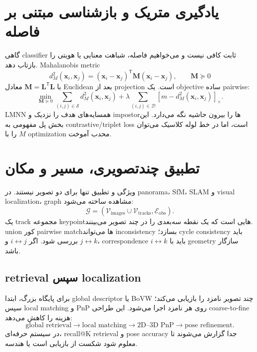 \documentclass[12pt,openany,oneside]{book}
\newcommand{\trans}{^{\mathsf T}}
\newcommand{\vect}[1]{\bm{#1}}
\newcommand{\mat}[1]{\bm{#1}}
\begin{document}
\section{یادگیری متریک و بازشناسی مبتنی بر فاصله}
گاهی classifier ثابت کافی نیست و می‌خواهیم فاصله، شباهت معنایی یا هویتی را بازتاب دهد. Mahalanobis metric
\begin{equation}
d_M^2(\vect x_i,\vect x_j)=(\vect x_i-\vect x_j)\trans\mat M(\vect x_i-\vect x_j),\qquad \mat M\succeq0
\end{equation}
با $\mat M=\mat L\trans\mat L$ معادل Euclidean بعد از projection است. یک objective ساده pairwise:
\begin{equation}
\min_{\mat M\succeq0}
\sum_{(i,j)\in\mathcal S}d_M^2(\vect x_i,\vect x_j)
+\lambda\sum_{(i,j)\in\mathcal D}[m-d_M^2(\vect x_i,\vect x_j)]_+.
\end{equation}
LMNN همسایه‌های هدف را نزدیک و impostorها را بیرون حاشیه نگه می‌دارد. این بخش پل مفهومی به contrastive/triplet loss است، اما در خط لوله کلاسیک می‌توان $M$ را با optimization محدب آموخت.

\section{تطبیق چندتصویری، مسیر و مکان}
ویژگی و تطبیق تنها برای دو تصویر نیستند. در panorama، SfM، SLAM و visual localization، graph مشاهده ساخته می‌شود:
\begin{equation}
\mathcal G=(\mathcal V_{\mathrm{images}}\cup\mathcal V_{\mathrm{tracks}},\mathcal E_{\mathrm{obs}}).
\end{equation}
یک track مجموعه keypointهایی است که یک نقطه سه‌بعدی را در چند تصویر می‌بینند. union کور pairwise matchها می‌تواند inconsistency بسازد؛ cycle consistency باید بررسی شود. اگر $i\leftrightarrow j$ و $j\leftrightarrow k$، correspondence $i\leftrightarrow k$ باید با geometry سازگار باشد.

\subsection{retrieval سپس localization}
برای پایگاه بزرگ، ابتدا global descriptor یا BoVW چند تصویر نامزد را بازیابی می‌کند؛ سپس local matching و PnP روی هر نامزد اجرا می‌شود. این طراحی coarse-to-fine هزینه را کاهش می‌دهد:
\[
\text{global retrieval}\rightarrow\text{local matching}\rightarrow\text{2D--3D PnP}\rightarrow\text{pose refinement}.
\]
در سیستم حرفه‌ای، recall@K retrieval و pose accuracy جدا گزارش می‌شوند تا معلوم شود شکست از بازیابی است یا هندسه.
\end{document}

